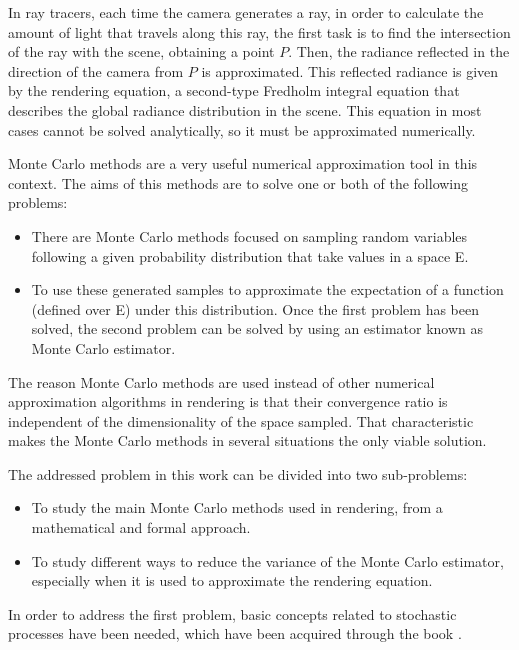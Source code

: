 In ray tracers, each time the camera generates a ray, in order to calculate the amount of light that travels along this ray, the first task is  to find the intersection of the ray with the scene, obtaining a point $P$. Then, the radiance reflected in the direction of the camera from $P$ is approximated. This reflected radiance is given by the rendering equation, a second-type Fredholm integral equation that describes the global radiance distribution in the scene. This equation in most cases cannot be solved analytically, so it must be approximated numerically.


Monte Carlo methods are a very useful numerical approximation tool in this context. The aims of this methods are to solve one or both of the following problems:
\begin{itemize} 
\item There are Monte Carlo methods focused on sampling random variables following a given probability distribution that take values in a space E. 
\item To use these generated samples to approximate the  expectation of a function (defined over E) under this distribution. Once the first problem has been solved, the second problem can be solved by using an estimator known as Monte Carlo estimator. 
\end{itemize}

The reason Monte Carlo methods are used instead of other numerical approximation algorithms in rendering is that their convergence ratio is independent of the dimensionality of the space sampled. That characteristic makes the Monte Carlo methods in several situations the only viable solution.\\


The addressed problem in this work can be divided into two sub-problems:
\begin{itemize}
\item To study the main Monte Carlo methods used in rendering, from a mathematical and formal approach.
\item To study different ways to reduce  the variance of the Monte Carlo estimator, especially when it is used to approximate the rendering equation.
\end{itemize}

In order to address the first problem,  basic concepts related to stochastic processes have been needed, which have been acquired through the book \cite{Williams1991}.

